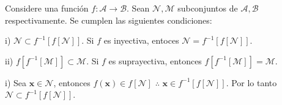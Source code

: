 
\begin{proposition}
	Considere una función $f:\mathcal{A}\longrightarrow\mathcal{B}$. Sean $\mathcal{N,M}$ subconjuntos de $\mathcal{A,B}$ respectivamente.
	Se cumplen las siguientes condiciones:
	\begin{iteritem}
	\item i) $\mathcal{N}\subset f^{-1}[f[\mathcal{N}]]$. Si $f$ es inyectiva, entoces $\mathcal{N}=f^{-1}[f[\mathcal{N}]]$.
	\item ii) $f[f^{-1}[\mathcal{M}]]\subset\mathcal{M}$. Si $f$ es suprayectiva, entonces $f[f^{-1}[\mathcal{M}]]=\mathcal{M}$.
	\end{iteritem}
\end{proposition}
\begin{proof2}
	i) Sea $\mathbf{x}\in\mathcal{N}$, entonces $f(\mathbf{x})\in f[\mathcal{N}]$ $\therefore$ $\mathbf{x}\in f^{-1}[f[\mathcal{N}]]$.
	Por lo tanto $\mathcal{N}\subset f^{-1}[f[\mathcal{N}]]$.\\
\end{proof2} 






























































